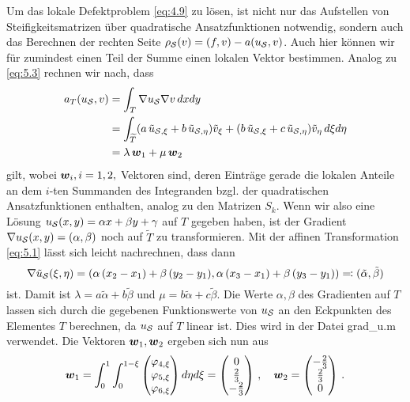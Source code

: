 Um das lokale Defektproblem \eqref{eq:4.9} zu lösen, ist nicht nur das Aufstellen von Steifigkeitsmatrizen über quadratische Ansatzfunktionen notwendig, sondern auch das Berechnen der rechten Seite $\rho_{\mathcal S}(v) = (f,v)-a(u_{\mathcal S},v)$. Auch hier können wir für zumindest einen Teil der Summe einen lokalen Vektor bestimmen. Analog zu \eqref{eq:5.3} rechnen wir nach, dass
\begin{align}\notag
	a_T(u_{\mathcal S},v) & = \int_T \nabla u_{\mathcal S} \nabla v \, dx dy \\
	\notag
	& = \int_{\widetilde T} (a\, \tilde u_{\mathcal S,\xi} + b \, \tilde u_{\mathcal S,\eta})\tilde v_\xi + (b\,  \tilde u_{\mathcal S,\xi}+ c \, \tilde u_{\mathcal S,\eta}) \tilde v_\eta \, d\xi d\eta \\
	\label{eq:5.6}
	& = \lambda \, \boldsymbol w_1 + \mu \, \boldsymbol w_2 
\end{align}
gilt, wobei $\boldsymbol w_i,i = 1,2,$ Vektoren sind, deren Einträge gerade die lokalen Anteile an dem $i$-ten Summanden des Integranden bzgl. der quadratischen Ansatzfunktionen enthalten, analog zu den Matrizen $S_k$. Wenn wir also eine Lösung $u_{\mathcal S}(x,y) = \alpha x+\beta y + \gamma$ auf $T$ gegeben haben, ist der Gradient $\nabla u_{\mathcal S}(x,y) = (\alpha,\beta)$ noch auf $\widetilde T$ zu transformieren. Mit der affinen Transformation \eqref{eq:5.1} lässt sich leicht nachrechnen, dass dann
\[
	\nabla \tilde u_{\mathcal S} (\xi,\eta) = (\alpha\, (x_2-x_1)+\beta \, (y_2-y_1), \alpha \, (x_3-x_1) + \beta \, (y_3-y_1)) \eqqcolon (\tilde \alpha, \tilde \beta)
\]
ist. Damit ist $\lambda = a\tilde \alpha + b \tilde\beta$ und $\mu = b \tilde \alpha + c \tilde \beta$. Die Werte $\alpha, \beta$ des Gradienten auf $T$ lassen sich durch die gegebenen Funktionswerte von $u_{\mathcal S}$ an den Eckpunkten des Elementes $T$ berechnen, da $u_{\mathcal S}$ auf $T$ linear ist. Dies wird in der Datei {\ttfamily grad_u.m} verwendet. Die Vektoren $\boldsymbol w_1,\boldsymbol w_2$ ergeben sich nun aus
\[
	\boldsymbol w_1 = \int_0^1\int_0^{1-\xi} \begin{pmatrix}
								\varphi_{4,\xi} \\
								\varphi_{5,\xi} \\
								\varphi_{6,\xi}
							\end{pmatrix} d\eta d\xi =  \begin{pmatrix}
								0 \\
								\frac 23 \\
								-\frac 23
							\end{pmatrix} \, , \quad 
							\boldsymbol w_2 =  \begin{pmatrix}
								-\frac 23 \\
								\frac 23 \\
								0
							\end{pmatrix} \, .
\]

